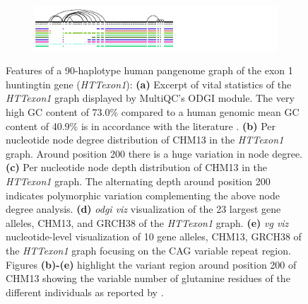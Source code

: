 \begin{figure}[]
\begin{subfigure}{\linewidth}
        \label{fig:metrics-viz}
    \end{subfigure}
    \begin{subfigure}{\linewidth}
        \caption{}
        \centering
        \includegraphics[width=1.0\linewidth, trim=-0.4cm 0.4cm 3.15cm 0cm]{fig/metrics/chr4_pan_HTTex1_STR_xg_svg}
        \label{fig:metrics-str}
        \vspace{-0.5em}
    \end{subfigure}
	\caption{Features of a 90-haplotype human pangenome graph of the exon 1 huntingtin gene (\textit{HTTexon1}): \textbf{(a)} Excerpt of vital statistics of the \textit{HTTexon1} graph displayed by MultiQC's ODGI module. The very high GC content of 73.0\% compared to a human genomic mean GC content of 40.9\% \citep{Piovesan2019} is in accordance with the literature \citep{Neueder2017}. \textbf{(b)} Per nucleotide node degree distribution of CHM13 in the \textit{HTTexon1} graph. Around position 200 there is a huge variation in node degree. \textbf{(c)} Per nucleotide node depth distribution of CHM13 in the \textit{HTTexon1} graph. The alternating depth around position 200 indicates polymorphic variation complementing the above node degree analysis. \textbf{(d)} \textit{odgi viz} visualization of the 23 largest gene alleles, CHM13, and GRCH38 of the \textit{HTTexon1} graph. \textbf{(e)} \textit{vg viz} nucleotide-level visualization of 10 gene alleles, CHM13, GRCH38 of the \textit{HTTexon1} graph focusing on the CAG variable repeat region. Figures \textbf{(b)-(e)} highlight the variant region around position 200 of CHM13 showing the variable number of glutamine residues of the different individuals as reported by \citep{Nance1999}.}
	\label{fig:metrics}
\end{figure}
